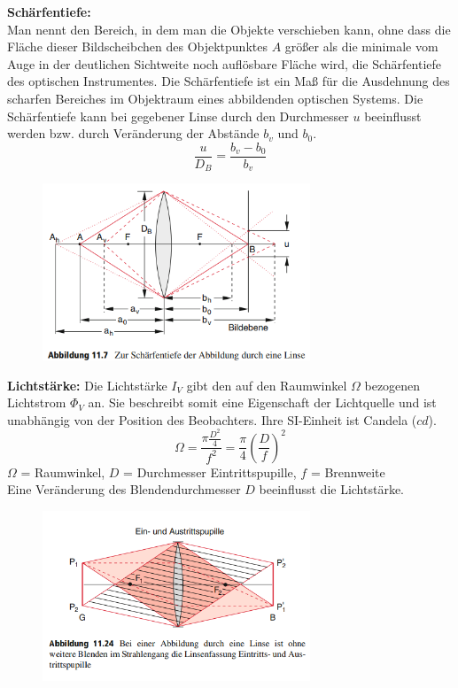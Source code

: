 \documentclass[a4paper, 11pt, ngerman, parskip=half-]{scrartcl}
\begin{document}
\textbf{Schärfentiefe:} \\
Man nennt den Bereich, in dem man die Objekte verschieben kann, ohne dass die Fläche dieser Bildscheibchen des Objektpunktes $A$ größer als die minimale vom Auge in der deutlichen Sichtweite noch auflösbare Fläche wird, die Schärfentiefe des optischen Instrumentes.
Die Schärfentiefe ist ein Maß für die Ausdehnung des scharfen Bereiches im Objektraum eines abbildenden optischen Systems. Die Schärfentiefe kann bei gegebener Linse durch den Durchmesser $u$ beeinflusst werden bzw. durch Veränderung der Abstände $b_v$ und $b_0$.
\begin{equation}
    \frac{u}{D_B} = \frac{b_v - b_0}{b_v}
\end{equation}
\begin{figure}[H]
    \centering
    \includegraphics[width=8cm]{image/20/11.png}
\end{figure}
\textbf{Lichtstärke:}
Die Lichtstärke $I_V$ gibt den auf den Raumwinkel $\Omega$ bezogenen Lichtstrom $\Phi_V$ an. Sie beschreibt somit eine Eigenschaft der Lichtquelle und ist unabhängig von der Position des Beobachters. Ihre SI-Einheit ist Candela ($\si{cd}$).
\begin{equation}
    \Omega = \frac{\pi \frac{D^2}{4}}{f^2} = \frac{\pi}{4} \left( \frac{D}{f} \right)^2
\end{equation}
$\Omega$ = Raumwinkel, $D$ = Durchmesser Eintrittspupille, $f$ = Brennweite\\
Eine Veränderung des Blendendurchmesser $D$ beeinflusst die Lichtstärke.
\begin{figure}[H]
    \centering
    \includegraphics[width=8cm]{image/20/12.png}
\end{figure}
\end{document}
